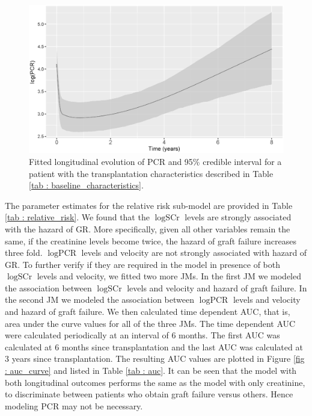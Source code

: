 \begin{figure}[!htb]
\centerline{\includegraphics[width=\columnwidth]{images/pcr.eps}}
\caption{Fitted longitudinal evolution of PCR and 95\% credible interval for a patient with the  transplantation characteristics described in Table \ref{tab : baseline_characteristics}.}
\label{fig : pcr_evolution}
\end{figure}

The parameter estimates for the relative risk sub-model are provided in Table \ref{tab : relative_risk}. We found that the $\log \mbox{SCr}$  levels are strongly associated with the hazard of GR. More specifically, given all other variables remain the same, if the creatinine levels become twice, the hazard of graft failure increases three fold. $\log \mbox{PCR}$ levels and velocity are not strongly associated with hazard of GR. To further verify if they are required in the model in presence of both $\log \mbox{SCr}$ levels and velocity, we fitted two more JMs. In the first JM we modeled the association between $\log \mbox{SCr}$ levels and velocity and hazard of graft failure. In the second JM we modeled the association between $\log \mbox{PCR}$ levels and velocity and hazard of graft failure. We then calculated time dependent AUC, that is, area under the curve \citep{landmarking2017,rizopoulosJMbayes} values for all of the three JMs. The time dependent AUC were calculated periodically at an interval of 6 months. The first AUC was calculated at 6 months since transplantation and the last AUC was calculated at 3 years since transplantation. The resulting AUC values are plotted in Figure \ref{fig : auc_curve} and listed in Table \ref{tab : auc}. It can be seen that the model with both longitudinal outcomes performs the same as the model with only creatinine, to discriminate between patients who obtain graft failure versus others. Hence modeling PCR may not be necessary.

